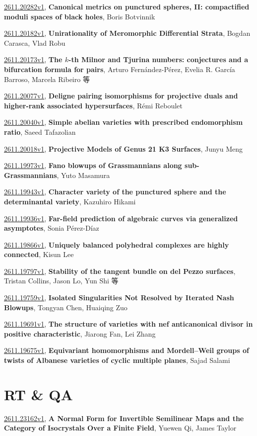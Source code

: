 \documentclass[9pt, a4paper]{article}
\theoremstyle{plain}
\theoremstyle{definition}
\theoremstyle{remark}
\newcommand{\arxiv}[3]{\href{https://arxiv.org/abs/#1}{#1}, \textbf{\textcolor{arxivblue}{#2}}, #3}
\begin{document}
\arxiv{2611.20282v1}{Canonical metrics on punctured spheres, II: compactified moduli spaces of black holes}{Boris Botvinnik}

\arxiv{2611.20182v1}{Unirationality of Meromorphic Differential Strata}{Bogdan Carasca, Vlad Robu}

\arxiv{2611.20173v1}{The $k$-th Milnor and Tjurina numbers: conjectures and a bifurcation formula for pairs}{Arturo Fernández-Pérez, Evelia R. García Barroso, Marcela Ribeiro 等}

\arxiv{2611.20077v1}{Deligne pairing isomorphisms for projective duals and higher-rank associated hypersurfaces}{Rémi Reboulet}

\arxiv{2611.20040v1}{Simple abelian varieties with prescribed endomorphism ratio}{Saeed Tafazolian}

\arxiv{2611.20018v1}{Projective Models of Genus 21 K3 Surfaces}{Junyu Meng}

\arxiv{2611.19973v1}{Fano blowups of Grassmannians along sub-Grassmannians}{Yuto Masamura}

\arxiv{2611.19943v1}{Character variety of the punctured sphere and the determinantal variety}{Kazuhiro Hikami}

\arxiv{2611.19936v1}{Far-field prediction of algebraic curves via generalized asymptotes}{Sonia Pérez-Díaz}

\arxiv{2611.19866v1}{Uniquely balanced polyhedral complexes are highly connected}{Kisun Lee}

\arxiv{2611.19797v1}{Stability of the tangent bundle on del Pezzo surfaces}{Tristan Collins, Jason Lo, Yun Shi 等}

\arxiv{2611.19759v1}{Isolated Singularities Not Resolved by Iterated Nash Blowups}{Tongyan Chen, Huaiqing Zuo}

\arxiv{2611.19691v1}{The structure of varieties with nef anticanonical divisor in positive characteristic}{Jiarong Fan, Lei Zhang}

\arxiv{2611.19675v1}{Equivariant homomorphisms and Mordell--Weil groups of twists of Albanese varieties of cyclic multiple planes}{Sajad Salami}


\section{RT \& QA}
\arxiv{2611.23162v1}{A Normal Form for Invertible Semilinear Maps and the Category of Isocrystals Over a Finite Field}{Yuewen Qi, James Taylor}
\end{document}
